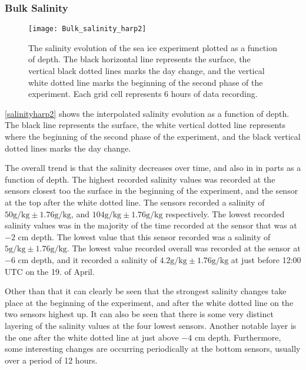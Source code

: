 \subsubsection{Bulk Salinity}
\begin{figure}[h!]
	\centering
	\texttt{[image: Bulk\_salinity\_harp2]}
	\caption{The salinity evolution of the sea ice experiment plotted as a function of depth. The black horizontal line represents the surface, the vertical black dotted lines marks the day change, and the vertical white dotted line marks the beginning of the second phase of the experiment. Each grid cell represents 6 hours of data recording.}
	\label{salinityharp2}
\end{figure}

\autoref{salinityharp2} shows the interpolated salinity evolution as a function of depth. The black line represents the surface, the white vertical dotted line represents where the beginning of the second phase of the experiment, and the black vertical dotted lines marks the day change. 

The overall trend is that the salinity decreases over time, and also in in parts as a function of depth. The highest recorded salinity values was recorded at the sensors closest too the surface in the beginning of the experiment, and the sensor at the top after the white dotted line. The sensors recorded a salinity of $50 \text{g}/\text{kg} \pm 1.76\text{g}/\text{kg}$, and $104 \text{g}/\text{kg} \pm 1.76\text{g}/\text{kg}$ respectively. The lowest recorded salinity values was in the majority of the time recorded at the sensor that was at $-2$ cm depth. The lowest value that this sensor recorded was a salinity of $5 \text{g}/\text{kg} \pm 1.76\text{g}/\text{kg}$. The lowest value recorded overall was recorded at the sensor at $-6$ cm depth, and it recorded a salinity of $4.2\text{g}/\text{kg} \pm 1.76\text{g}/\text{kg}$ at just before 12:00 UTC on the 19. of April.

Other than that it can clearly be seen that the strongest salinity changes take place at the beginning of the experiment, and after the white dotted line on the two sensors highest up. It can also be seen that there is some very distinct layering of the salinity values at the four lowest sensors. Another notable layer is the one after the white dotted line at just above $-4$ cm depth. Furthermore, some interesting changes are occurring periodically at the bottom sensors, usually over a period of 12 hours. 



